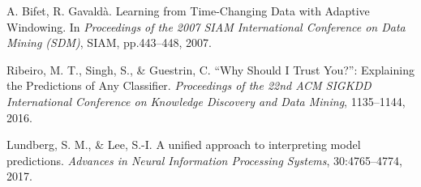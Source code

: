 \documentclass[manuscript,screen,review]{acmart}
\begin{document}
\begin{thebibliography}{99}
A. Bifet, R. Gavaldà.
\newblock Learning from Time-Changing Data with Adaptive Windowing.
\newblock In \textit{Proceedings of the 2007 SIAM International Conference on Data Mining (SDM)}, SIAM, pp.443--448, 2007.

Ribeiro, M. T., Singh, S., \& Guestrin, C.
\newblock ``Why Should I Trust You?'': Explaining the Predictions of Any Classifier.
\newblock \textit{Proceedings of the 22nd ACM SIGKDD International Conference on Knowledge Discovery and Data Mining}, 1135--1144, 2016.

Lundberg, S. M., \& Lee, S.-I.
\newblock A unified approach to interpreting model predictions.
\newblock \textit{Advances in Neural Information Processing Systems}, 30:4765--4774, 2017.

\end{thebibliography}
\end{document}
